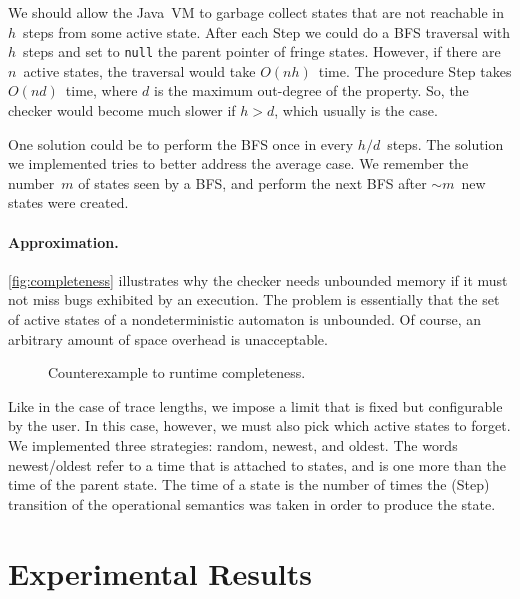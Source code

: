 \documentclass[9pt, preprint]{sigplanconf} %
\newcommand{\noterg}[2]{\textcolor{gray}{[\textcolor{red}{#1}: #2]}}
\newcommand{\dd}[1]{\noterg{dd}{#1}}
\newcommand{\dinocomment}[1]{\dd{#1}}
\theoremstyle{definition}
\theoremstyle{remark}
\begin{document}
We should allow the Java~VM to garbage collect states that are not reachable in $h$~steps from some active state.
After each {\sc Step} we could do a BFS traversal with $h$~steps and set to {\tt null} the parent pointer of fringe states.
However, if there are $n$~active states, the traversal would take $O(nh)$~time.
The procedure {\sc Step} takes $O(nd)$~time, where $d$ is the maximum out-degree of the property.
So, the checker would become much slower if $h>d$, which usually is the case.

One solution could be to perform the BFS once in every $h/d$~steps.
The solution we implemented tries to better address the average case.
We remember the number~$m$ of states seen by a BFS, and perform the next BFS after $\sim m$~new states were created.

\paragraph{Approximation.}

\autoref{fig:completeness} illustrates why the checker needs unbounded memory if it must not miss bugs exhibited by an execution.
The problem is essentially that the set of active states of a nondeterministic automaton is unbounded.
Of course, an arbitrary amount of space overhead is unacceptable.

\begin{figure}[t]
\begin{center}

\caption{Counterexample to runtime completeness.}
\label{fig:completeness}
\end{center}
\end{figure}

Like in the case of trace lengths, we impose a limit that is fixed but configurable by the user.
In this case, however, we must also pick which active states to forget.
We implemented three strategies: random, newest, and oldest.
The words newest\slash oldest refer to a time that is attached to states, and is one more than the time of the parent state.
The time of a state is the number of times the (Step) transition of the operational semantics was taken in order to produce the state.


\section{Experimental Results}\label{sec:results} %
\end{document}
